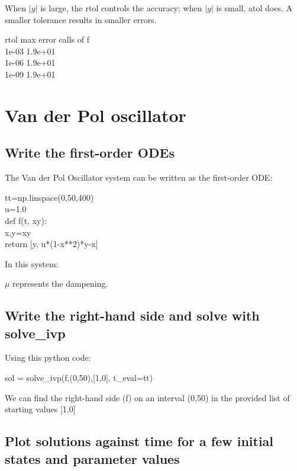 \documentclass[11pt]{article}
\begin{document}
\noindent When $|y|$ is large, the rtol controls the accuracy; when $|y|$ is small, atol does. A smaller tolerance results in smaller errors.
\begin{center}
\noindent rtol    \quad  max error  \quad calls of f \\
1e-03  \quad   1.9e+01   \\
1e-06  \quad   1.9e+01   \\
1e-09  \quad   1.9e+01 
\end{center}

\section{Van der Pol oscillator} \cite{VanDerPol}

\subsection{Write the first-order ODEs}
\noindent The Van der Pol Oscillator system can be written as the first-order ODE:

\begin{center}
    tt=np.linspace(0,50,400)\\
u=1.0\\
def f(t, xy): \\
    x,y=xy \\
    return [y, u*(1-x**2)*y-x] \\
\end{center}

In this system:
\begin{center}
    $\mu$ represents the dampening.
\end{center}

\subsection{Write the right-hand side and solve with solve\_ivp}

Using this python code:

\begin{center}
    sol = solve\_ivp(f,(0,50),[1,0], t\_eval=tt)
\end{center}

We can find the right-hand side (f) on an interval (0,50) in the provided list of starting values [1,0]

\subsection{Plot solutions against time for a few initial states and parameter values}
\end{document}
